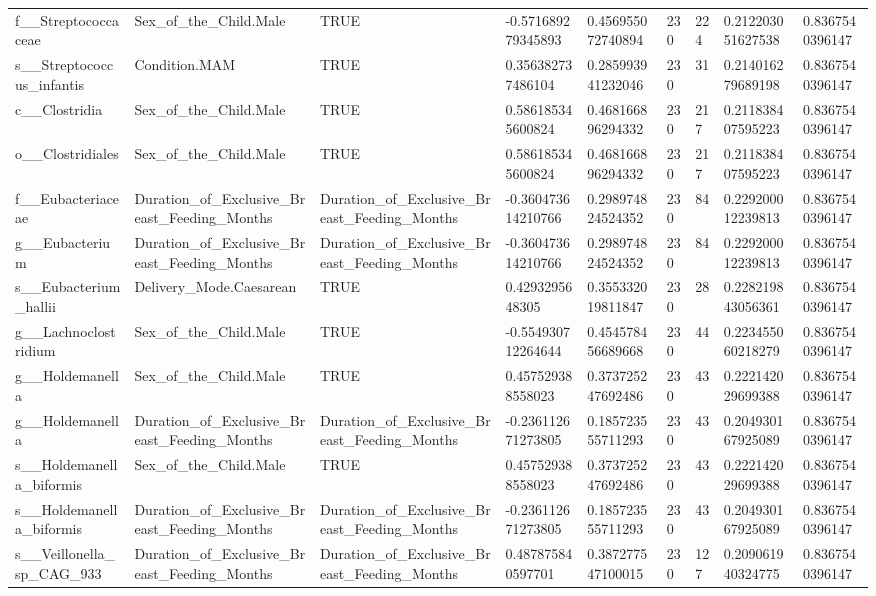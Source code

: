 \begin{longtable}{lllllllll}
f\_\_Streptococcaceae & Sex\_of\_the\_Child.Male & TRUE & -0.571689279345893 & 0.456955072740894 & 230 & 224 & 0.212203051627538 & 0.8367540396147 \\
s\_\_Streptococcus\_infantis & Condition.MAM & TRUE & 0.356382737486104 & 0.285993941232046 & 230 & 31 & 0.214016279689198 & 0.8367540396147 \\
c\_\_Clostridia & Sex\_of\_the\_Child.Male & TRUE & 0.586185345600824 & 0.468166896294332 & 230 & 217 & 0.211838407595223 & 0.8367540396147 \\
o\_\_Clostridiales & Sex\_of\_the\_Child.Male & TRUE & 0.586185345600824 & 0.468166896294332 & 230 & 217 & 0.211838407595223 & 0.8367540396147 \\
f\_\_Eubacteriaceae & Duration\_of\_Exclusive\_Breast\_Feeding\_Months & Duration\_of\_Exclusive\_Breast\_Feeding\_Months & -0.360473614210766 & 0.298974824524352 & 230 & 84 & 0.229200012239813 & 0.8367540396147 \\
g\_\_Eubacterium & Duration\_of\_Exclusive\_Breast\_Feeding\_Months & Duration\_of\_Exclusive\_Breast\_Feeding\_Months & -0.360473614210766 & 0.298974824524352 & 230 & 84 & 0.229200012239813 & 0.8367540396147 \\
s\_\_Eubacterium\_hallii & Delivery\_Mode.Caesarean & TRUE & 0.4293295648305 & 0.355332019811847 & 230 & 28 & 0.228219843056361 & 0.8367540396147 \\
g\_\_Lachnoclostridium & Sex\_of\_the\_Child.Male & TRUE & -0.554930712264644 & 0.454578456689668 & 230 & 44 & 0.223455060218279 & 0.8367540396147 \\
g\_\_Holdemanella & Sex\_of\_the\_Child.Male & TRUE & 0.457529388558023 & 0.373725247692486 & 230 & 43 & 0.222142029699388 & 0.8367540396147 \\
g\_\_Holdemanella & Duration\_of\_Exclusive\_Breast\_Feeding\_Months & Duration\_of\_Exclusive\_Breast\_Feeding\_Months & -0.236112671273805 & 0.185723555711293 & 230 & 43 & 0.204930167925089 & 0.8367540396147 \\
s\_\_Holdemanella\_biformis & Sex\_of\_the\_Child.Male & TRUE & 0.457529388558023 & 0.373725247692486 & 230 & 43 & 0.222142029699388 & 0.8367540396147 \\
s\_\_Holdemanella\_biformis & Duration\_of\_Exclusive\_Breast\_Feeding\_Months & Duration\_of\_Exclusive\_Breast\_Feeding\_Months & -0.236112671273805 & 0.185723555711293 & 230 & 43 & 0.204930167925089 & 0.8367540396147 \\
s\_\_Veillonella\_sp\_CAG\_933 & Duration\_of\_Exclusive\_Breast\_Feeding\_Months & Duration\_of\_Exclusive\_Breast\_Feeding\_Months & 0.487875840597701 & 0.387277547100015 & 230 & 127 & 0.209061940324775 & 0.8367540396147 \\

\end{longtable}
